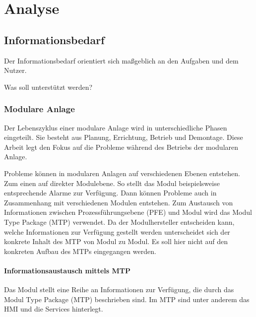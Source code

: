
\chapter{Analyse}
\label{sec:Anforderungsanalyse}

\section{Informationsbedarf}
Der Informationsbedarf orientiert sich maßgeblich an den Aufgaben und dem Nutzer.

Was soll unterstützt werden?

\subsection{Modulare Anlage}
Der Lebenszyklus einer modulare Anlage wird in unterschiedliche Phasen eingeteilt. Sie besteht aus Planung, Errichtung, Betrieb und Demontage. \cite{} Diese Arbeit legt den Fokus auf die Probleme während des Betriebs der modularen Anlage.


Probleme können in modularen Anlagen auf verschiedenen Ebenen entstehen. Zum einen auf direkter Modulebene. So stellt das Modul beispielsweise entsprechende Alarme zur Verfügung. Dann können Probleme auch in Zusammenhang mit verschiedenen Modulen entstehen. Zum Austausch von Informationen zwischen Prozessführungsebene (PFE) und Modul wird das Modul Type Package (MTP) verwendet. Da der Modulhersteller entscheiden kann, welche Informationen zur Verfügung gestellt werden unterscheidet sich der konkrete Inhalt des MTP von Modul zu Modul. Es soll hier nicht auf den konkreten Aufbau des MTPs eingegangen werden.

\subsubsection{Informationsaustausch mittels MTP}
Das Modul stellt eine Reihe an Informationen zur Verfügung, die durch das Modul Type Package (MTP) beschrieben sind. Im MTP sind unter anderem das HMI und die Services hinterlegt.

